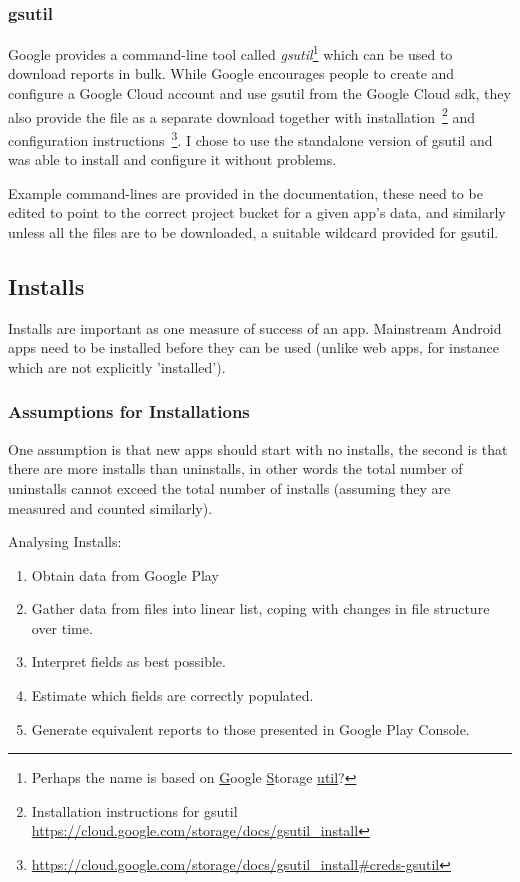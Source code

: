 \subsubsection{gsutil}
Google provides a command-line tool called \emph{gsutil}\footnote{Perhaps the name is based on \underline{G}oogle \underline{S}torage \underline{util}?} which can be used to download reports in bulk. While Google encourages people to create and configure a Google Cloud account and use gsutil from the Google Cloud sdk, they also provide the file as a separate download together with installation~\footnote{Installation instructions for gsutil \url{https://cloud.google.com/storage/docs/gsutil_install}} and configuration instructions~\footnote{\url{https://cloud.google.com/storage/docs/gsutil_install\#creds-gsutil}}. I chose to use the standalone version of gsutil and was able to install and configure it without problems.  

Example command-lines are provided in the documentation, these need to be edited to point to the correct project bucket for a given app's data, and similarly unless all the files are to be downloaded, a suitable wildcard provided for gsutil.  


\subsection{Installs}
Installs are important as one measure of success of an app. Mainstream Android apps need to be installed before they can be used (unlike web apps, for instance which are not explicitly 'installed'). 

\subsubsection{Assumptions for Installations } 
One assumption is that new apps should start with no installs, the second is that there are more installs than uninstalls, in other words the total number of uninstalls cannot exceed the total number of installs (assuming they are measured and counted similarly).

Analysing Installs: 
\begin{enumerate}
    \item Obtain data from Google Play
    \item Gather data from files into linear list, coping with changes in file structure over time.
    \item Interpret fields as best possible.
    \item Estimate which fields are correctly populated.
    \item Generate equivalent reports to those presented in Google Play Console.
\end{enumerate}


